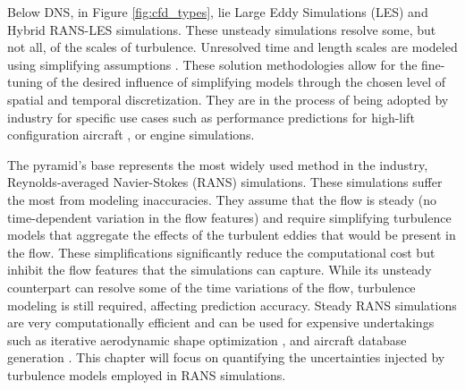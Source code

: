 Below DNS, in Figure \ref{fig:cfd_types}, lie Large Eddy Simulations (LES) and Hybrid RANS-LES simulations.
These unsteady simulations resolve some, but not all, of the scales of turbulence.
Unresolved time and length scales are modeled using simplifying assumptions \cite{pope_2000}.
These solution methodologies allow for the fine-tuning of the desired influence of simplifying models through the chosen level of spatial and temporal discretization.
They are in the process of being adopted by industry for specific use cases such as performance predictions for high-lift configuration aircraft \cite{rumsey2019overview}, or engine simulations. 

The pyramid's base represents the most widely used method in the industry, Reynolds-averaged Navier-Stokes (RANS) simulations.
These simulations suffer the most from modeling inaccuracies.
They assume that the flow is steady (no time-dependent variation in the flow features) and require simplifying turbulence models that aggregate the effects of the turbulent eddies that would be present in the flow.
These simplifications significantly reduce the computational cost but inhibit the flow features that the simulations can capture.
While its unsteady counterpart can resolve some of the time variations of the flow, turbulence modeling is still required, affecting prediction accuracy.
Steady RANS simulations are very computationally efficient and can be used for expensive undertakings such as iterative aerodynamic shape optimization \cite{lyu2015aerodynamic}, and aircraft database generation \cite{wendorff_combining_2016}.
This chapter will focus on quantifying the uncertainties injected by turbulence models employed in RANS simulations. 
